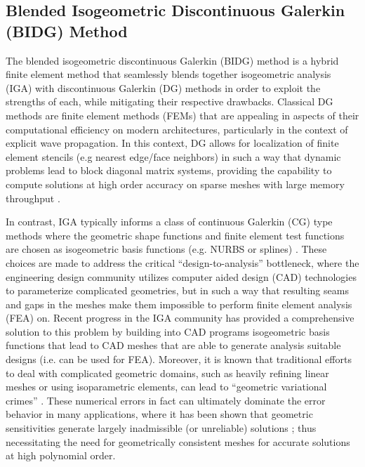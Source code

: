 \subsection{Blended Isogeometric Discontinuous Galerkin (BIDG) Method}
\label{sec:isogeometric}
The blended isogeometric discontinuous Galerkin (BIDG) method is a hybrid finite element method that seamlessly blends together isogeometric analysis (IGA) with discontinuous Galerkin (DG) methods in order to exploit the strengths of each, while mitigating their respective drawbacks. Classical DG methods are finite element methods (FEMs) that are appealing in
aspects of their computational efficiency on modern architectures,
particularly in the context of explicit wave propagation.  In this context, DG allows for localization of
finite element stencils (e.g nearest edge/face neighbors) in such a way that dynamic problems lead to block
diagonal matrix systems, providing the capability to compute solutions at high order accuracy on sparse meshes with large memory throughput \cite{Klockner20097863}.

In contrast, IGA typically informs a class of continuous Galerkin (CG) type methods where the geometric shape functions and finite element test functions are chosen as isogeometric basis functions (e.g. NURBS or splines) \cite{Riesenfeld20151054}.  These choices are made to address the critical ``design-to-analysis'' bottleneck, where the engineering design community utilizes computer aided design (CAD) technologies to parameterize complicated geometries, but in such a way that resulting seams and gaps in the meshes make them impossible to perform finite element analysis (FEA) on.  Recent progress in the IGA community has provided a comprehensive solution to this problem by building into CAD programs isogeometric basis functions that lead to CAD meshes that are able to generate analysis suitable designs (i.e. can be used for FEA).  Moreover, it is known that traditional efforts to deal with complicated geometric domains, such as heavily refining linear meshes or using isoparametric elements, can lead to ``geometric variational crimes'' \cite{Michoski2016658}.    These numerical errors in fact can ultimately dominate the error behavior in many applications, where it has been shown that geometric sensitivities generate largely inadmissible (or unreliable) solutions \cite{Wirasaet2015597,Fahs:2011:IAH:2003056.2003066,Toulorge_a2d}; thus necessitating the need for geometrically consistent meshes for accurate solutions at high polynomial order.


